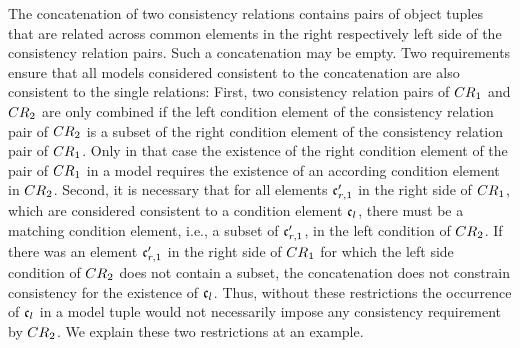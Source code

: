 The concatenation of two consistency relations contains pairs of object tuples that are related across common elements in the right respectively left side of the consistency relation pairs.
Such a concatenation may be empty.
Two requirements ensure that all models considered consistent to the concatenation are also consistent to the single relations:
First, two consistency relation pairs of $\consistencyrelation{CR}{1}$ and $\consistencyrelation{CR}{2}$ are only combined if the left condition element of the consistency relation pair of $\consistencyrelation{CR}{2}$ is a subset of the right condition element of the consistency relation pair %
of $\consistencyrelation{CR}{1}$.
Only in that case the existence of the right condition element of the pair of $\consistencyrelation{CR}{1}$ in a model requires the existence of an according condition element in $\consistencyrelation{CR}{2}$.
Second, it is necessary that for all elements $\conditionelement{c}{r,1}'$ in the right side of $\consistencyrelation{CR}{1}$, which are considered consistent to a condition element $\conditionelement{c}{l}$, there must be a matching condition element, i.e., a subset of $\conditionelement{c}{r,1}'$, in the left condition of $\consistencyrelation{CR}{2}$.
If there was an element $\conditionelement{c}{r,1}'$ in the right side of $\consistencyrelation{CR}{1}$ for which the left side condition of $\consistencyrelation{CR}{2}$ does not contain a subset, the concatenation does not constrain consistency for the existence of $\conditionelement{c}{l}$.
Thus, without these restrictions the occurrence of $\conditionelement{c}{l}$ in a model tuple would not necessarily impose any consistency requirement by $\consistencyrelation{CR}{2}$.
We explain these two restrictions at an example.


